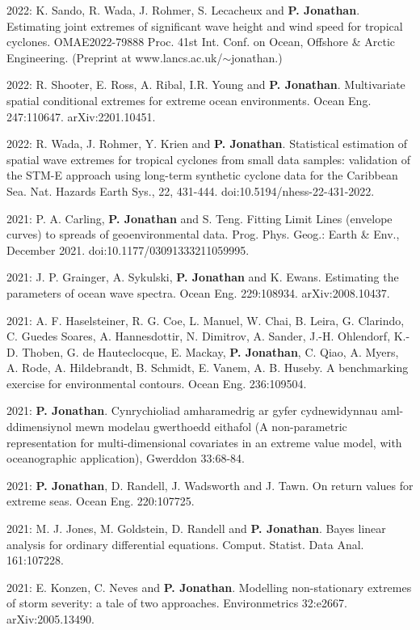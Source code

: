 \documentclass[11pt,a4paper]{moderncv}
\begin{document}
2022: K. Sando, R. Wada, J. Rohmer, S. Lecacheux and \textbf{P. Jonathan}. Estimating joint extremes of significant wave height and wind speed for tropical cyclones. OMAE2022-79888 Proc. 41st Int. Conf. on Ocean, Offshore \& Arctic Engineering. (Preprint at www.lancs.ac.uk/$\sim$jonathan.)

2022: R. Shooter, E. Ross, A. Ribal, I.R. Young and \textbf{P. Jonathan}. Multivariate spatial conditional extremes for extreme ocean environments. Ocean Eng. 247:110647. arXiv:2201.10451.

2022: R. Wada, J. Rohmer, Y. Krien and \textbf{P. Jonathan}. Statistical estimation of spatial wave extremes for tropical cyclones from small data samples: validation of the STM-E approach using long-term synthetic cyclone data for the Caribbean Sea. Nat. Hazards Earth Sys., 22, 431-444. doi:10.5194/nhess-22-431-2022.

2021: P. A. Carling, \textbf{P. Jonathan} and S. Teng. Fitting Limit Lines (envelope curves) to spreads of geoenvironmental data. Prog. Phys. Geog.: Earth \& Env., December 2021. doi:10.1177/03091333211059995.

2021: J. P. Grainger, A. Sykulski, \textbf{P. Jonathan} and K. Ewans. Estimating the parameters of ocean wave spectra. Ocean Eng. 229:108934. arXiv:2008.10437.

2021: A. F. Haselsteiner, R. G. Coe, L. Manuel, W. Chai, B. Leira, G. Clarindo, C. Guedes Soares, A. Hannesdottir, N. Dimitrov, A. Sander, J.-H. Ohlendorf, K.-D. Thoben, G. de Hauteclocque, E. Mackay, \textbf{P. Jonathan}, C. Qiao, A. Myers, A. Rode, A. Hildebrandt, B. Schmidt, E. Vanem, A. B. Huseby. A benchmarking exercise for environmental contours. Ocean Eng. 236:109504.

2021: \textbf{P. Jonathan}. Cynrychioliad amharamedrig ar gyfer cydnewidynnau aml-ddimensiynol mewn modelau gwerthoedd eithafol (A non-parametric representation for multi-dimensional covariates in an extreme value model, with oceanographic application), Gwerddon 33:68-84. 

2021: \textbf{P. Jonathan}, D. Randell, J. Wadsworth and J. Tawn. On return values for extreme seas. Ocean Eng. 220:107725.

2021: M. J. Jones, M. Goldstein, D. Randell and \textbf{P. Jonathan}. Bayes linear analysis for ordinary differential equations. Comput. Statist. Data Anal. 161:107228.

2021: E. Konzen, C. Neves and \textbf{P. Jonathan}. Modelling non-stationary extremes of storm severity: a tale of two approaches. Environmetrics 32:e2667. arXiv:2005.13490.
\end{document}
